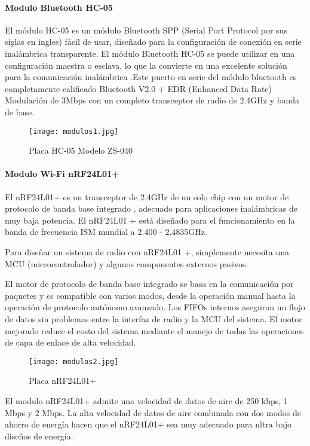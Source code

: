 \paragraph{Modulo Bluetooth HC-05}
El módulo HC-05 es un módulo Bluetooth SPP (Serial Port Protocol por sus siglas en ingles) fácil de usar, diseñado para la configuración de conexión en serie inalámbrica transparente. El módulo Bluetooth HC-05 se puede utilizar en una configuración maestra o esclava, lo que la convierte en una excelente solución para la comunicación inalámbrica .Este puerto en serie del módulo bluetooth es completamente calificado Bluetooth V2.0 + EDR (Enhanced Data Rate) Modulación de 3Mbps con un completo transceptor de radio de 2.4GHz y banda de base\cite{bluetooth}.

\begin{figure}[H]
	\centering
	\texttt{[image: modulos1.jpg]}
	\caption{Placa HC-05 Modelo ZS-040}
\end{figure}

\paragraph{Modulo Wi-Fi nRF24L01+}
El nRF24L01+ es un transceptor de 2.4GHz de un solo chip con un motor de protocolo de banda base integrado
, adecuado para aplicaciones inalámbricas de muy baja potencia. El nRF24L01 + está diseñado
para el funcionamiento en la banda de frecuencia ISM mundial a 2.400 - 2.4835GHz\cite{nrf}.

\par \noindent
Para diseñar un sistema de radio con nRF24L01 +, simplemente necesita una MCU (microcontrolador) y algunos componentes externos pasivos.

\par \noindent
El motor de protocolo de banda base integrado se basa en la comunicación por paquetes
y es compatible con varios modos, desde la operación manual hasta la operación de protocolo autónomo avanzado. 
Los FIFOs internos aseguran un flujo de datos sin problemas entre la interfaz de radio y la MCU del sistema. El motor mejorado reduce el costo del sistema mediante el manejo de todas las operaciones de capa de enlace de alta velocidad\cite{nrf}.

\begin{figure}[H]
	\centering
	\texttt{[image: modulos2.jpg]}
	\caption{Placa nRF24L01+}
\end{figure}

\par \noindent
El modulo nRF24L01+ admite una velocidad de datos de aire de 250 kbps, 1 Mbps y 2 Mbps.
La alta velocidad de datos de aire combinada con dos modos de ahorro de energía hacen que el nRF24L01+ sea muy adecuado para ultra bajo
diseños de energía\cite{nrf}.

